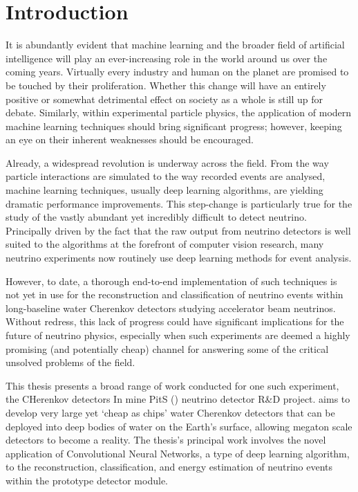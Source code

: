 \chapter{Introduction} %
\label{chap:introduction} %
\setcounter{page}{17}  %

It is abundantly evident that machine learning and the broader field of artificial intelligence
will play an ever-increasing role in the world around us over the coming years. Virtually every
industry and human on the planet are promised to be touched by their proliferation. Whether this
change will have an entirely positive or somewhat detrimental effect on society as a whole is
still up for debate. Similarly, within experimental particle physics, the application of modern
machine learning techniques should bring significant progress; however, keeping an eye on their
inherent weaknesses should be encouraged.

Already, a widespread revolution is underway across the field. From the way particle interactions
are simulated to the way recorded events are analysed, machine learning techniques, usually deep
learning algorithms, are yielding dramatic performance improvements. This step-change is
particularly true for the study of the vastly abundant yet incredibly difficult to detect
neutrino. Principally driven by the fact that the raw output from neutrino detectors is well
suited to the algorithms at the forefront of computer vision research, many neutrino experiments
now routinely use deep learning methods for event analysis.

However, to date, a thorough end-to-end implementation of such techniques is not yet in use for
the reconstruction and classification of neutrino events within long-baseline water Cherenkov
detectors studying accelerator beam neutrinos. Without redress, this lack of progress could have
significant implications for the future of neutrino physics, especially when such experiments are
deemed a highly promising (and potentially cheap) channel for answering some of the critical
unsolved problems of the field.

This thesis presents a broad range of work conducted for one such experiment, the CHerenkov
detectors In mine PitS (\chips) neutrino detector R\&D project. \chips aims to develop very large
yet `cheap as chips' water Cherenkov detectors that can be deployed into deep bodies of water on
the Earth's surface, allowing megaton scale detectors to become a reality. The thesis's principal
work involves the novel application of Convolutional Neural Networks, a type of deep learning
algorithm, to the reconstruction, classification, and energy estimation of neutrino events within
the \chipsfive prototype detector module.


